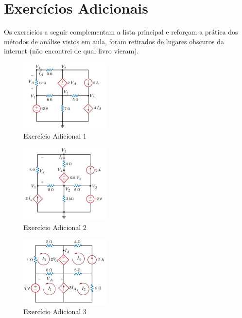 \newpage
\section{Exercícios Adicionais}

\paragraph{}
Os exercícios a seguir complementam a lista principal e reforçam a prática dos
métodos de análise vistos em aula, foram retirados de lugares obscuros da
internet (não encontrei de qual livro vieram).

\begin{figure}[H]
  \centering
  \includegraphics[width=0.4\textwidth]{./fig/figP3.5.png}
  \caption{Exercício Adicional 1}\label{fig:figP3.5}
\end{figure}
\answer{
}

\begin{figure}[H]
  \centering
  \includegraphics[width=0.4\textwidth]{./fig/figP3.51.png}
  \caption{Exercício Adicional 2}\label{fig:figP3.51}
\end{figure}
\answer{
}

\newpage
{}
\begin{figure}[H]
  \centering
  \includegraphics[width=0.4\textwidth]{./fig/figP3.98.png}
  \caption{Exercício Adicional 3}\label{fig:figP3.98}
\end{figure}
\answer{
}
